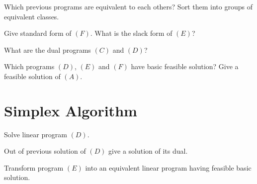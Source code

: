 \documentclass[11pt,a4paper]{article}
\begin{document}
\begin{question}
  Which previous programs are equivalent to each others? Sort them
  into groups of equivalent classes.
\end{question}

\begin{question}
  Give standard form of $(F)$. What is the slack form of $(E)$?
\end{question}

\begin{question}
  What are the dual programs $(C)$ and $(D)$?
\end{question}

\begin{question}
  Which programs $(D)$, $(E)$ and $(F)$ have basic feasible
  solution?  Give a feasible solution of $(A)$.
\end{question}

\newpage
\section{Simplex Algorithm}

\begin{question}
  Solve linear program $(D)$.
\end{question}

\begin{question}
  Out of previous solution of $(D)$ give a solution of its dual.
\end{question}

\begin{question}
  Transform program $(E)$ into an equivalent linear program having
  feasible basic solution.
\end{question}
\end{document}

